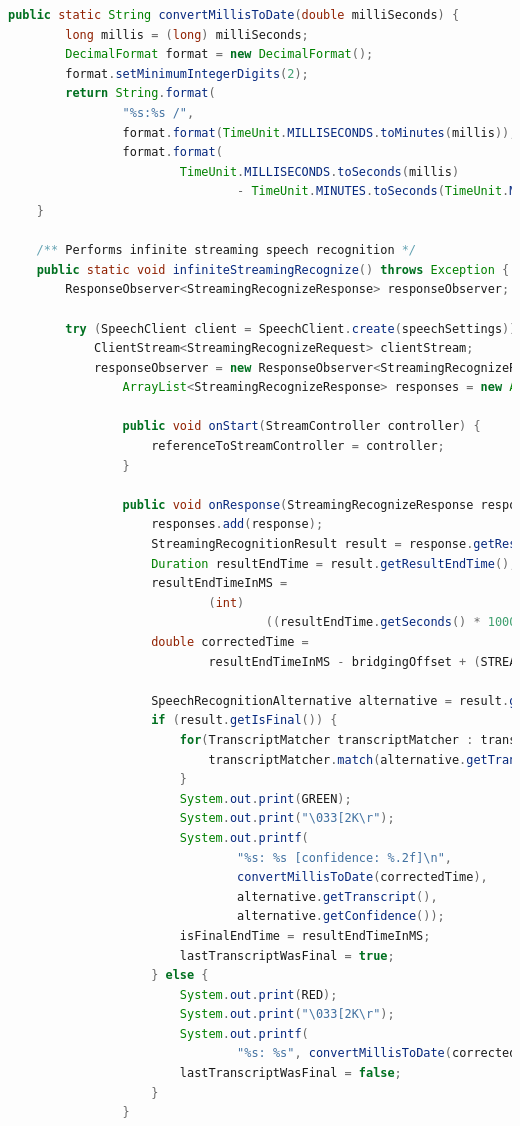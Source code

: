 \documentclass[oneside, 12pt]{book}
\begin{document}
\begin{center}
\begin{lstlisting}[language=java]
    public static String convertMillisToDate(double milliSeconds) {
        long millis = (long) milliSeconds;
        DecimalFormat format = new DecimalFormat();
        format.setMinimumIntegerDigits(2);
        return String.format(
                "%s:%s /",
                format.format(TimeUnit.MILLISECONDS.toMinutes(millis)),
                format.format(
                        TimeUnit.MILLISECONDS.toSeconds(millis)
                                - TimeUnit.MINUTES.toSeconds(TimeUnit.MILLISECONDS.toMinutes(millis))));
    }

    /** Performs infinite streaming speech recognition */
    public static void infiniteStreamingRecognize() throws Exception {
        ResponseObserver<StreamingRecognizeResponse> responseObserver;

        try (SpeechClient client = SpeechClient.create(speechSettings)) {
            ClientStream<StreamingRecognizeRequest> clientStream;
            responseObserver = new ResponseObserver<StreamingRecognizeResponse>() {
                ArrayList<StreamingRecognizeResponse> responses = new ArrayList<>();

                public void onStart(StreamController controller) {
                    referenceToStreamController = controller;
                }

                public void onResponse(StreamingRecognizeResponse response) {
                    responses.add(response);
                    StreamingRecognitionResult result = response.getResultsList().get(0);
                    Duration resultEndTime = result.getResultEndTime();
                    resultEndTimeInMS =
                            (int)
                                    ((resultEndTime.getSeconds() * 1000) + (resultEndTime.getNanos() / 1000000));
                    double correctedTime =
                            resultEndTimeInMS - bridgingOffset + (STREAMING_LIMIT * restartCounter);

                    SpeechRecognitionAlternative alternative = result.getAlternativesList().get(0);
                    if (result.getIsFinal()) {
                        for(TranscriptMatcher transcriptMatcher : transcriptMatcherList){
                            transcriptMatcher.match(alternative.getTranscript().trim());
                        }
                        System.out.print(GREEN);
                        System.out.print("\033[2K\r");
                        System.out.printf(
                                "%s: %s [confidence: %.2f]\n",
                                convertMillisToDate(correctedTime),
                                alternative.getTranscript(),
                                alternative.getConfidence());
                        isFinalEndTime = resultEndTimeInMS;
                        lastTranscriptWasFinal = true;
                    } else {
                        System.out.print(RED);
                        System.out.print("\033[2K\r");
                        System.out.printf(
                                "%s: %s", convertMillisToDate(correctedTime), alternative.getTranscript());
                        lastTranscriptWasFinal = false;
                    }
                }


\end{lstlisting}
\end{center}
\end{document}
